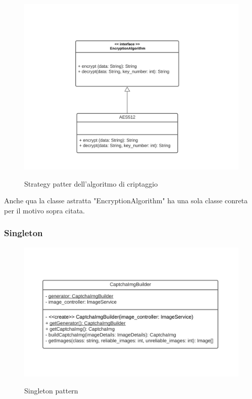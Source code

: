 \begin{figure}[H]
    \centering
    \includegraphics[scale = 1.0]{img/criptStrategy.png}\\
    \caption{Strategy patter dell'algoritmo di criptaggio}
\end{figure}

Anche qua la classe astratta "EncryptionAlgorithm" ha una sola classe conreta per il motivo sopra citata.

\subsubsection{Singleton}

\begin{figure}[H]
    \centering
    \includegraphics[scale = 1.0]{img/singleton.png}\\
    \caption{Singleton pattern}
\end{figure}